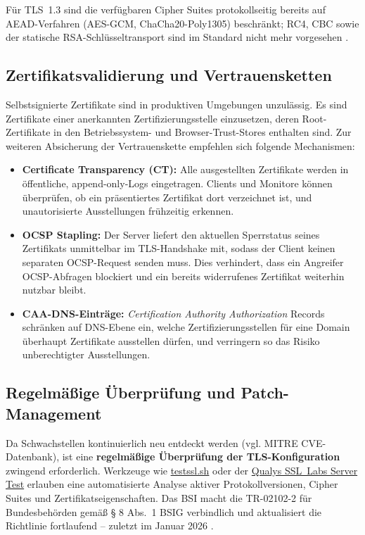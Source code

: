 Für TLS~1.3 sind die verfügbaren Cipher Suites protokollseitig bereits auf AEAD-Verfahren (AES-GCM, ChaCha20-Poly1305) beschränkt; RC4, CBC sowie der statische RSA-Schlüsseltransport sind im Standard nicht mehr vorgesehen \cite{windows-papst-ciphers,mozilla-ssl-gen}.

\subsection*{Zertifikatsvalidierung und Vertrauensketten}

Selbstsignierte Zertifikate sind in produktiven Umgebungen unzulässig. Es sind Zertifikate einer anerkannten Zertifizierungsstelle einzusetzen, deren Root-Zertifikate in den Betriebssystem- und Browser-Trust-Stores enthalten sind. Zur weiteren Absicherung der Vertrauenskette empfehlen sich folgende Mechanismen:

\begin{itemize}
  \item \textbf{Certificate Transparency (CT):} 
    Alle ausgestellten Zertifikate werden in öffentliche, append-only-Logs eingetragen. Clients und Monitore können überprüfen, ob ein präsentiertes Zertifikat dort verzeichnet ist, und unautorisierte Ausstellungen frühzeitig erkennen.
  \item \textbf{OCSP Stapling:} 
    Der Server liefert den aktuellen Sperrstatus seines Zertifikats unmittelbar im TLS-Handshake mit, sodass der Client keinen separaten OCSP-Request senden muss. Dies     verhindert, dass ein Angreifer OCSP-Abfragen blockiert und ein bereits widerrufenes Zertifikat weiterhin nutzbar bleibt.
  \item \textbf{CAA-DNS-Einträge:} 
    \emph{Certification Authority Authorization} Records schränken auf DNS-Ebene ein, welche Zertifizierungsstellen für eine Domain überhaupt Zertifikate ausstellen dürfen, und verringern so das Risiko unberechtigter Ausstellungen.
\end{itemize}

\subsection*{Regelmäßige Überprüfung und Patch-Management}

Da Schwachstellen kontinuierlich neu entdeckt werden (vgl. MITRE CVE-Datenbank), ist eine \textbf{regelmäßige Überprüfung der TLS-Konfiguration} zwingend erforderlich. Werkzeuge wie \href{https://testssl.sh}{testssl.sh} oder der \href{https://www.ssllabs.com/ssltest/}{Qualys SSL~Labs Server Test} erlauben eine automatisierte Analyse aktiver Protokollversionen, Cipher Suites und Zertifikatseigenschaften. Das BSI macht die TR-02102-2 für Bundesbehörden gemäß § 8 Abs.~1 BSIG verbindlich und aktualisiert die Richtlinie fortlaufend -- zuletzt im Januar 2026 \cite{kes-bsi-tr}.
